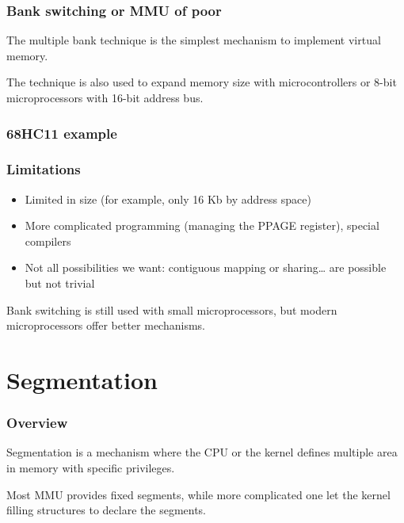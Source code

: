
\begin{frame}
  \frametitle{Bank switching or MMU of poor}

  The multiple bank technique is the simplest mechanism to implement
  virtual memory.

  \-

  The technique is also used to expand memory size with
  microcontrollers or 8-bit microprocessors with 16-bit address bus.

\end{frame}


\begin{frame}
  \frametitle{68HC11 example}

  \begin{center}
  \end{center}

\end{frame}


\begin{frame}
  \frametitle{Limitations}

  \begin{itemize}
  \item
    Limited in size (for example, only 16 Kb by address space)
  \item
    More complicated programming (managing the PPAGE register),
    special compilers
  \item
    Not all possibilities we want: contiguous mapping or
    sharing\ldots{} are possible but not trivial
  \end{itemize}

  \-

  Bank switching is still used with small microprocessors, but modern
  microprocessors offer better mechanisms.

\end{frame}

%
%

\section{Segmentation}


\begin{frame}
  \frametitle{Overview}

  Segmentation is a mechanism where the CPU or the kernel defines
  multiple area in memory with specific privileges.

  \-

  Most MMU provides fixed segments, while more complicated one let the
  kernel filling structures to declare the segments.

\end{frame}

